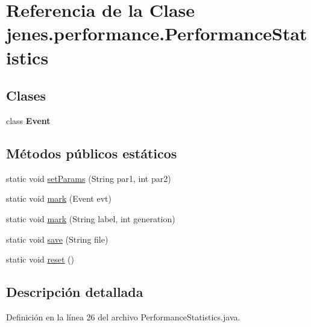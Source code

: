 \hypertarget{classjenes_1_1performance_1_1_performance_statistics}{\section{Referencia de la Clase jenes.\-performance.\-Performance\-Statistics}
\label{classjenes_1_1performance_1_1_performance_statistics}
}
\subsection*{Clases}
\begin{DoxyCompactItemize}
\item 
class {\bfseries Event}
\end{DoxyCompactItemize}
\subsection*{Métodos públicos estáticos}
\begin{DoxyCompactItemize}
\item 
static void \hyperlink{classjenes_1_1performance_1_1_performance_statistics_a6a2f77191a06922c9bbc3be567c94be4}{set\-Params} (String par1, int par2)
\item 
static void \hyperlink{classjenes_1_1performance_1_1_performance_statistics_a34a1034b034368f40314908f451a8cc6}{mark} (Event evt)
\item 
static void \hyperlink{classjenes_1_1performance_1_1_performance_statistics_a3f39608489ba96dca0b07f6f26eae268}{mark} (String label, int generation)
\item 
static void \hyperlink{classjenes_1_1performance_1_1_performance_statistics_a96952887207f02e11b543c4f93f48a18}{save} (String file)
\item 
static void \hyperlink{classjenes_1_1performance_1_1_performance_statistics_aeb062f4bb2d714e70245c67798ddc3e3}{reset} ()
\end{DoxyCompactItemize}


\subsection{Descripción detallada}


Definición en la línea 26 del archivo Performance\-Statistics.\-java.



